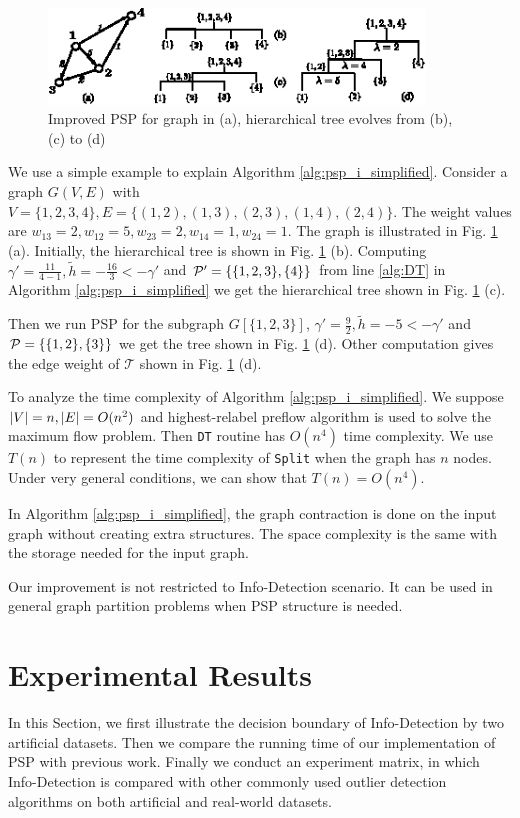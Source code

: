 \documentclass[runningheads]{llncs}
\begin{document}
\begin{figure}[!ht]
	\centering
	\includegraphics[width=10cm]{pic/alg_illustration.eps}
	\caption{Improved PSP for graph in (a), hierarchical tree evolves from (b), (c) to (d) }\label{fig:alg_eg}
\end{figure}

\begin{example}
	We use a simple example to explain Algorithm \ref{alg:psp_i_simplified}. Consider a graph $G(V, E)$ with $V=\{1,2,3,4\}, E=\{(1,2),(1,3),(2,3),(1,4),(2,4)\}$. The weight values are $w_{13}=2, w_{12}=5, w_{23}=2, w_{14}=1, w_{24}=1$. The graph is illustrated
	in Fig. \ref{fig:alg_eg} (a). Initially, the hierarchical tree is shown in Fig. \ref{fig:alg_eg} (b). Computing $\gamma' = \frac{11}{4-1}, \tilde{h} = -\frac{16}{3} < -\gamma' $ and $\P' = \{\{1,2,3\},\{4\}\}$ from line \ref {alg:DT} in Algorithm \ref{alg:psp_i_simplified} we get the hierarchical tree shown in Fig. \ref{fig:alg_eg} (c).
	
	Then we run PSP for the subgraph $G[\{1,2,3\}]$, $\gamma' = \frac{9}{2}, \tilde{h} = -5 < -\gamma'$ and $\P= \{\{1,2\},\{3\}\}$ we get the tree shown in Fig. \ref{fig:alg_eg} (d). Other computation gives the edge weight of $\mathcal{T}$ shown in Fig. \ref{fig:alg_eg} (d).
\end{example}		

To analyze the time complexity of Algorithm \ref{alg:psp_i_simplified}. We suppose $\abs{V} = n, \abs{E} = O(n^2)$ and highest-relabel preflow algorithm is used to solve the maximum flow problem. Then \texttt{DT} routine has $O(n^4)$ time complexity. 
We use $T(n)$ to represent the time complexity of \texttt{Split} when the graph has $n$ nodes. Under very general conditions, we can show that $T(n) = O(n^4)$. 

In Algorithm \ref{alg:psp_i_simplified}, the graph contraction is done on the input graph without creating extra structures. The space complexity is the same with the storage needed for the input graph. 

Our improvement is not restricted to Info-Detection scenario. It can be used in general graph partition problems when PSP structure is needed.

\section{Experimental Results}\label{sec:Experiemt}
In this Section, we first illustrate the decision boundary of Info-Detection by two artificial datasets. Then we compare the running time of our implementation of PSP with previous work. Finally we conduct an experiment matrix, in which Info-Detection is compared with other commonly used outlier detection algorithms on both artificial and real-world datasets.
\end{document}
